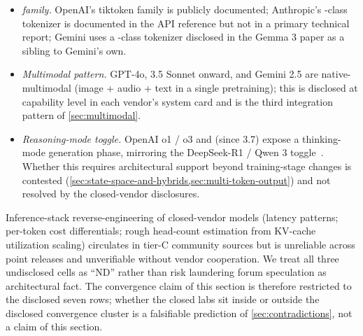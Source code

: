 \begin{itemize}
\item \emph{ family.} OpenAI's tiktoken family is
publicly documented; Anthropic's -class tokenizer is documented
in the API reference but not in a primary technical report; Gemini
uses a -class tokenizer disclosed in the Gemma 3 paper
\citep[\S 2.3]{gemma3} as a sibling to Gemini's own.
\item \emph{Multimodal pattern.} GPT-4o,  3.5 Sonnet onward,
and Gemini 2.5 are native-multimodal (image + audio + text in a
single pretraining); this is disclosed at capability level in each
vendor's system card and is the third integration pattern of
\cref{sec:multimodal}.
\item \emph{Reasoning-mode toggle.} OpenAI o1 / o3 and (since 3.7)
 expose a thinking-mode generation phase, mirroring the
DeepSeek-R1 / Qwen 3 toggle~\citep[\S 2]{deepseek-r1, qwen3}.
Whether this requires architectural support beyond training-stage
changes is contested
(\cref{sec:state-space-and-hybrids,sec:multi-token-output}) and
not resolved by the closed-vendor disclosures.
\end{itemize}

\begin{forumsignal}
Inference-stack reverse-engineering of closed-vendor models (latency
patterns; per-token cost differentials; rough head-count estimation
from KV-cache utilization scaling) circulates in tier-C community
sources but is unreliable across point releases and unverifiable
without vendor cooperation. We treat all three undisclosed cells as
``ND'' rather than risk laundering forum speculation as architectural
fact. The convergence claim of this section is therefore restricted
to the disclosed seven rows; whether the closed labs sit inside or
outside the disclosed convergence cluster is a falsifiable prediction
of \cref{sec:contradictions}, not a claim of this section.
\end{forumsignal}

